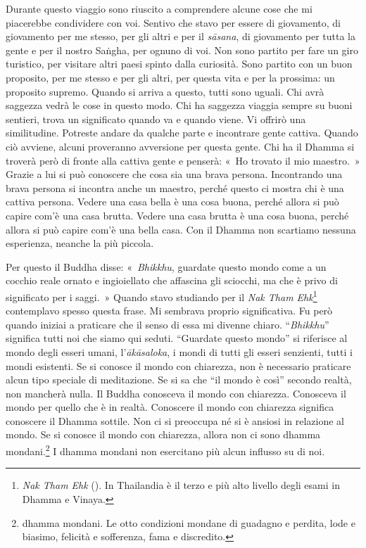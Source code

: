 Durante questo viaggio sono riuscito a comprendere alcune cose che mi
piacerebbe condividere con voi. Sentivo che stavo per essere di
giovamento, di giovamento per me stesso, per gli altri e per il
\emph{sāsana}, di giovamento per tutta la gente e per il nostro Saṅgha,
per ognuno di voi. Non sono partito per fare un giro turistico, per
visitare altri paesi spinto dalla curiosità. Sono partito con un buon
proposito, per me stesso e per gli altri, per questa vita e per la
prossima: un proposito supremo. Quando si arriva a questo, tutti sono
uguali. Chi avrà saggezza vedrà le cose in questo modo. Chi ha saggezza
viaggia sempre su buoni sentieri, trova un significato quando va e
quando viene. Vi offrirò una similitudine. Potreste andare da qualche
parte e incontrare gente cattiva. Quando ciò avviene, alcuni proveranno
avversione per questa gente. Chi ha il Dhamma si troverà però di fronte
alla cattiva gente e penserà: «~Ho trovato il mio maestro.~» Grazie a
lui si può conoscere che cosa sia una brava persona. Incontrando una
brava persona si incontra anche un maestro, perché questo ci mostra chi
è una cattiva persona. Vedere una casa bella è una cosa buona, perché
allora si può capire com'è una casa brutta. Vedere una casa brutta è una
cosa buona, perché allora si può capire com'è una bella casa. Con il
Dhamma non scartiamo nessuna esperienza, neanche la più piccola.

Per questo il Buddha disse: «~\emph{Bhikkhu}, guardate questo mondo come
a un cocchio reale ornato e ingioiellato che affascina gli sciocchi, ma
che è privo di significato per i saggi.~» Quando stavo studiando per il
\emph{Nak Tham Ehk}\footnote{\emph{Nak Tham Ehk} (). In
  Thailandia è il terzo e più alto livello degli esami in Dhamma e
  Vinaya.} contemplavo spesso questa frase. Mi sembrava proprio
significativa. Fu però quando iniziai a praticare che il senso di essa
mi divenne chiaro. ``\emph{Bhikkhu}'' significa tutti noi che siamo qui
seduti. ``Guardate questo mondo'' si riferisce al mondo degli esseri
umani, l'\emph{ākāsaloka}, i mondi di tutti gli esseri senzienti, tutti
i mondi esistenti. Se si conosce il mondo con chiarezza, non è
necessario praticare alcun tipo speciale di meditazione. Se si sa che
``il mondo è così'' secondo realtà, non mancherà nulla. Il Buddha
conosceva il mondo con chiarezza. Conosceva il mondo per quello che è in
realtà. Conoscere il mondo con chiarezza significa conoscere il Dhamma
sottile. Non ci si preoccupa né si è ansiosi in relazione al mondo. Se
si conosce il mondo con chiarezza, allora non ci sono dhamma
mondani.\footnote{dhamma mondani. Le otto condizioni mondane di
  guadagno e perdita, lode e biasimo, felicità e sofferenza, fama e
  discredito.} I dhamma mondani non esercitano più alcun influsso
su di noi.

